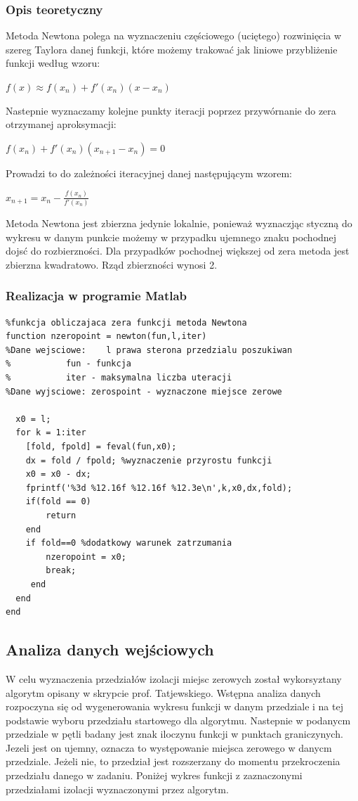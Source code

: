 \documentclass[a4paper, 11pt]{article}
\begin{document}
\subsubsection{Opis teoretyczny}
Metoda Newtona polega na wyznaczeniu częściowego (uciętego) rozwinięcia w szereg Taylora danej funkcji, które możemy trakować jak liniowe przybliżenie funkcji według wzoru:\
  	\begin{center}
  	$f(x) \approx f(x_{n})+f'(x_{n})(x-x_{n})$
	\end{center}
Nastepnie wyznaczamy kolejne punkty iteracji poprzez przywórnanie do zera otrzymanej aproksymacji:\\
\begin{center}
$f(x_{n})+f'(x_{n})(x_{n+1}-x_{n}) = 0$
\end{center}
Prowadzi to do zależności iteracyjnej danej następującym wzorem:\\
\begin{center}
$x_{n+1} = x_{n}-\frac{f(x_{n})}{f'(x_{n})}$
\end{center}
Metoda Newtona jest zbierzna jedynie lokalnie, ponieważ wyznaczjąc styczną do wykresu w danym punkcie możemy w przypadku ujemnego znaku pochodnej dojsć do rozbierzności. Dla przypadków pochodnej większej od zera metoda jest zbierzna kwadratowo. Rząd zbierzności wynosi 2.

\subsubsection{Realizacja w programie Matlab}
\begin{lstlisting}
%funkcja obliczajaca zera funkcji metoda Newtona
function nzeropoint = newton(fun,l,iter)
%Dane wejsciowe:	l prawa sterona przedzialu poszukiwan
%			fun - funkcja 
%			iter - maksymalna liczba uteracji
%Dane wyjsciowe: zerospoint - wyznaczone miejsce zerowe
    
  x0 = l; 
  for k = 1:iter
    [fold, fpold] = feval(fun,x0); 
    dx = fold / fpold; %wyznaczenie przyrostu funkcji
    x0 = x0 - dx;
    fprintf('%3d %12.16f %12.16f %12.3e\n',k,x0,dx,fold);
    if(fold == 0)
        return
    end
	if fold==0 %dodatkowy warunek zatrzumania
        nzeropoint = x0;
        break; 
     end
  end
end
\end{lstlisting}

\subsection{Analiza danych wejściowych}
W celu wyznaczenia przedziałów izolacji miejsc zerowych został wykorsyztany algorytm opisany w skrypcie prof. Tatjewskiego. Wstępna analiza danych rozpoczyna się od wygenerowania wykresu funkcji w danym przedziale i na tej podstawie wyboru przedziału startowego dla algorytmu. Nastepnie w podanycm przedziale w pętli badany jest znak iloczynu funkcji w punktach graniczynych. Jezeli jest on ujemny, oznacza to występowanie miejsca zerowego w danycm przedziale. Jeżeli nie, to przedział jest rozszerzany do momentu przekroczenia przedziału danego w zadaniu. 
Poniżej wykres funkcji z zaznaczonymi przedziałami izolacji wyznaczonymi przez algorytm. 
\end{document}
